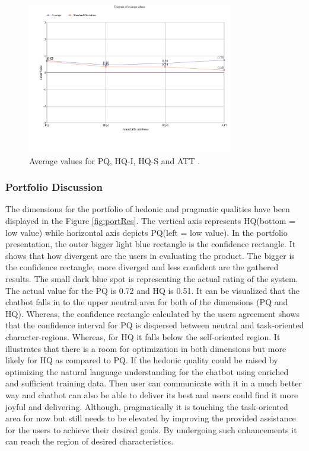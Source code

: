 \begin{figure}[!h]
    \centering
    \includegraphics[width=0.8\textwidth]{img/Diagram_for_Avg_Values.png}
    \caption{Average values for PQ, HQ-I, HQ-S and ATT \cite{attrakdiff}.}
    \label{fig:avgValAttrak}
\end{figure}

\subsubsection*{Portfolio Discussion}
The dimensions for the portfolio of hedonic and pragmatic qualities have been displayed in the Figure \ref{fig:portRes}. The vertical axis represents HQ(bottom = low value) while horizontal axis depicts PQ(left = low value). In the portfolio presentation, the outer bigger light blue rectangle is the confidence rectangle. It shows that how divergent are the users in evaluating the product. The bigger is the confidence rectangle, more diverged and less confident are the gathered results. The small dark blue spot is representing the actual rating of the system. The actual value for the PQ is 0.72 and HQ is 0.51. It can be visualized that the chatbot falls in to the upper neutral area for both of the dimensions (PQ and HQ). Whereas, the confidence rectangle calculated by the users agreement shows that the confidence interval for PQ is dispersed between neutral and task-oriented character-regions. Whereas, for HQ it falls below the self-oriented region. It illustrates that there is a room for optimization in both dimensions but more likely for HQ as compared to PQ. If the hedonic quality could be raised by optimizing the natural language understanding for the chatbot using enriched and sufficient training data. Then user can communicate with it in a much better way and chatbot can also be able to deliver its best and users could find it more joyful and delivering. Although, pragmatically it is touching the task-oriented area for now but still needs to be elevated by improving the provided assistance for the users to achieve their desired goals. By undergoing such enhancements it can reach the region of desired characteristics.

